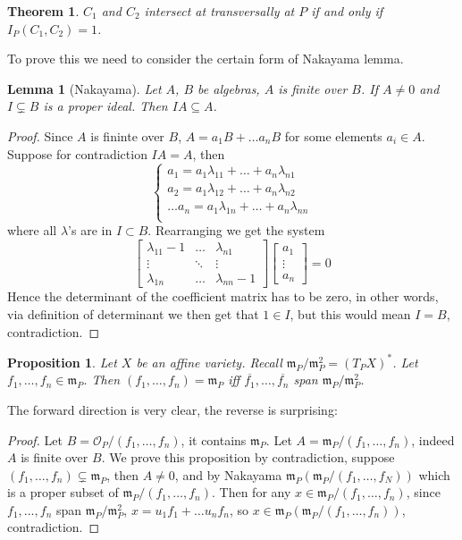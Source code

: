 \documentclass[12pt]{article}
\newcommand{\m}{\mathfrak{m}}
\renewcommand{\O}{\mathcal{O}}
\newtheorem{theorem}{Theorem}[section]
\newtheorem{proposition}{Proposition}[section]
\newtheorem{lemma}{Lemma}[section]
\begin{document}
    \begin{theorem}\label{thm:1_int}
        $C_1$ and $C_2$ intersect at transversally at $P$ if and only if $I_P(C_1, C_2) = 1$. 
    \end{theorem}
    To prove this we need to consider the certain form of Nakayama lemma. 
    \begin{lemma}
        [Nakayama] Let $A$, $B$ be algebras, $A$ is finite over $B$. If $A \neq 0$ and $I \subsetneq B$ is a proper ideal. Then $IA \subseteq A$. 
    \end{lemma}
    \begin{proof}
        Since $A$ is fininte over $B$, $A = a_1B + \dots a_nB$ for some elements $a_i \in A$. Suppose for contradiction $IA = A$, then 
        $$\begin{cases}
            a_1 = a_1\lambda_{11} + \dots + a_n\lambda_{n1} \\
            a_2 = a_1\lambda_{12} + \dots + a_n\lambda_{n2} \\
            \dots 
            a_n = a_1\lambda_{1n} + \dots + a_n\lambda_{nn} \\
        \end{cases}
        $$
        where all $\lambda$'s are in $I \subset B$. Rearranging we get the system 
        $$\begin{bmatrix}
            \lambda_{11} - 1 & \dots &  \lambda_{n1} \\
            \vdots & \ddots & \vdots \\
            \lambda_{1n} & \dots & \lambda_{nn} - 1
        \end{bmatrix}\begin{bmatrix}
            a_1 \\
            \vdots \\
            a_n
        \end{bmatrix} = 0$$
        Hence the determinant of the coefficient matrix has to be zero, in other words, via definition of determinant we then get that $1 \in I$, but this would mean $I = B$, contradiction. 
    \end{proof}
    \begin{proposition}
        Let $X$ be an affine variety. Recall $\m_P/\m_P^2 = (T_PX)^*$. Let $f_1, \dots, f_n \in \m_P$. Then $(f_1, \dots, f_n) = \m_P$ iff $\overline{f_1}, \dots, \overline{f_n}$ span $\m_P/\m_P^2$.
    \end{proposition}
    The forward direction is very clear, the reverse is surprising: 
    \begin{proof}
        Let $B = \O_P/(f_1, \dots, f_n)$, it contains $\m_P$. Let $A = \m_P/(f_1, \dots, f_n)$, indeed $A$ is finite over $B$. We prove this proposition by contradiction, suppose $(f_1, \dots, f_n) \subsetneq \m_P$, then $A \neq 0$, and by Nakayama $\m_P(\m_P/(f_1, \dots, f_N))$ which is a proper subset of $\m_P/(f_1, \dots, f_n)$. Then for any $x \in \m_P/(f_1, \dots, f_n)$, since $f_1, \dots, f_n$ span $\m_P/\m_P^2$, $x = u_1f_1 + \dots u_nf_n$, so $x \in \m_P(\m_P/(f_1, \dots, f_n))$, contradiction.  
    \end{proof}
\end{document}
